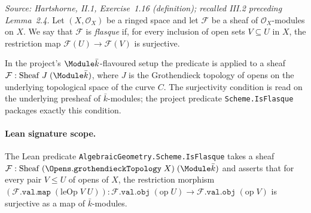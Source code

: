 \begin{definition}

  \label{def:isFlasque_sheaf}
  \textit{Source: Hartshorne, II.1, Exercise~1.16 (definition); recalled
  III.2 preceding Lemma~2.4.}
  Let \((X, \mathcal O_X)\) be a ringed space and let \(\mathcal F\) be a
  sheaf of \(\mathcal O_X\)-modules on \(X\). We say that \(\mathcal F\)
  is \emph{flasque} if, for every inclusion of open sets
  \(V \subseteq U\) in \(X\), the restriction map
  \(\mathcal F(U) \to \mathcal F(V)\) is surjective.

  In the project's \(\Module \bar k\)-flavoured setup the predicate is
  applied to a sheaf
  \(\mathcal F : \mathrm{Sheaf}\;J\;(\Module \bar k)\), where \(J\) is the
  Grothendieck topology of opens on the underlying topological space of
  the curve \(C\). The surjectivity condition is read on the underlying
  presheaf of \(\bar k\)-modules; the project predicate
  \texttt{Scheme.IsFlasque} packages exactly this condition.

  \paragraph{Lean signature scope.} The Lean predicate
  \texttt{AlgebraicGeometry.Scheme.IsFlasque} takes a sheaf
  \(\mathcal F : \mathrm{Sheaf}\;(\Opens.\mathtt{grothendieckTopology}\;X)\;
  (\Module \bar k)\) and asserts that for every pair \(V \le U\) of opens
  of \(X\), the restriction morphism
  \((\mathcal F.\mathtt{val.map}\;(\mathrm{leOp}\;V\;U)) :
  \mathcal F.\mathtt{val.obj}\;(\mathrm{op}\;U) \to
  \mathcal F.\mathtt{val.obj}\;(\mathrm{op}\;V)\) is surjective as a map of
  \(\bar k\)-modules.
\end{definition}

